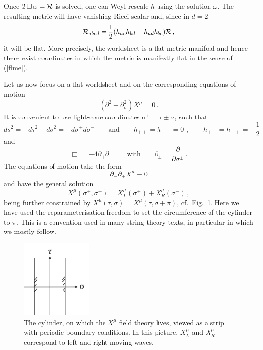 \documentclass[12pt]{article}
\newcommand{\be}{\begin{equation}}
\newcommand{\ee}{\end{equation}}
\numberwithin{equation}{section}
\begin{document}
Once $2\,\Box\,\omega={\cal R}$ is solved, one can Weyl rescale $h$ using the solution $\omega$. The resulting metric will have vanishing Ricci scalar and, since in $d=2$
\be
{\cal R}_{abcd}=\frac{1}{2}(h_{ac}h_{bd}-h_{ad}h_{bc}){\cal R}\,,
\ee
it will be flat. More precisely, the worldsheet is a flat metric manifold and hence there exist coordinates in which the metric is manifestly flat in the sense of (\ref{flme}). 

Let us now focus on a flat worldsheet and on the corresponding equations of motion
\be
(\partial_\tau^2-\partial_\sigma^2)X^\mu=0\,.
\ee
It is convenient to use light-cone coordinates $\sigma^{\pm}=\tau\pm\sigma$, such that
\be
ds^2=-d\tau^2+d\sigma^2=-d\sigma^+d\sigma^-\qquad\mbox{and}\qquad
h_{++}=h_{--}=0\,\,,\qquad h_{+-}=h_{-+}=-\frac{1}{2}
\ee
and
\be
\Box=-4\partial_+\partial_-\qquad\mbox{with}\qquad \partial_\pm= \frac{\partial}{\partial \sigma^{\pm}}\,.
\ee
The equations of motion take the form
\be
\partial_-\partial_+X^\mu=0
\ee
and have the general solution
\be
X^\mu(\sigma^+,\sigma^-)=X^\mu_L(\sigma^+)+X_R^\mu(\sigma^-)\,,
\ee
being further constrained by $X^\mu(\tau,\sigma)=X^\mu(\tau,\sigma+\pi)$, cf.~Fig.~\ref{strip}. Here we have used the reparameterisation freedom to set the circumference of the cylinder to $\pi$. This is a convention used in many string theory texts, in particular in \cite{Green:1987sp} which we mostly follow.

\begin{figure}[ht]
\begin{center} 
\includegraphics[width=3.5cm]{strip.png}
\caption{The cylinder, on which the $X^\mu$ field theory lives, viewed as a strip with periodic boundary conditions.  In this picture, $X^\mu_L$ and $X^\mu_R$ correspond to left and right-moving waves.}
\label{strip} 
\end{center}
\end{figure}
\end{document}
